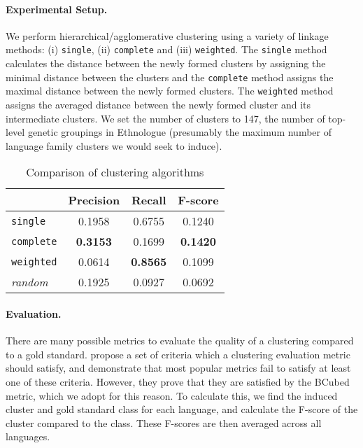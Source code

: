 \paragraph{Experimental Setup.}
We perform hierarchical/agglomerative clustering using a variety of linkage methods: (i) \texttt{single}, (ii) \texttt{complete} and (iii) \texttt{weighted}.
The \texttt{single} method calculates the distance between the newly formed clusters by assigning the minimal distance between the clusters and the \texttt{complete} method assigns the maximal distance between the newly formed clusters. The \texttt{weighted} method assigns the averaged distance between the newly formed cluster and its intermediate clusters. We set the number of clusters to 147, the number of top-level genetic groupings in Ethnologue (presumably the maximum number of language family clusters we would seek to induce).


\begin{table}[t]
\begin{centering}

    \begin{tabular}{l|ccc}
    ~        & Precision & Recall       & F-score    \\ \hline
    \texttt{single} & 0.1958	& 0.6755	 & 0.1240  \\
	\texttt{complete} & \textbf{0.3153}	& 0.1699	 & \textbf{0.1420} \\
	\texttt{weighted} & 0.0614	& \textbf{0.8565}	 & 0.1099 \\ \hline
	\emph{random} & 0.1925 &	0.0927 & 	0.0692 \\
    \end{tabular}
\caption{Comparison of clustering algorithms} %
\end{centering}
 \label{table:cluster}
\end{table}

\paragraph{Evaluation.}
There are many possible metrics to evaluate the quality of a clustering compared to a gold standard. 
 propose a set of criteria which a clustering evaluation metric should satisfy, and demonstrate that most popular metrics fail to satisfy at least one of these criteria.  However, they prove that they are satisfied by the BCubed metric, which we adopt for this reason.  To calculate this, we find the induced cluster and gold standard class for each language, and calculate the F-score of the cluster compared to the class.  These F-scores are then averaged across all languages.


